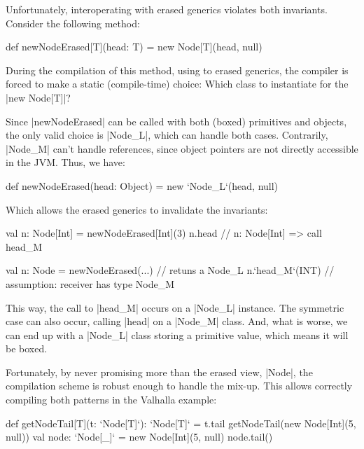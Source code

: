 Unfortunately, interoperating with erased generics violates both invariants. Consider the following method:

\begin{lstlisting-nobreak}
 def newNodeErased[T](head: T) =
   new Node[T](head, null)
\end{lstlisting-nobreak}

During the compilation of this method, using to erased generics, the compiler is forced to make a static (compile-time) choice: Which class to instantiate for the |new Node[T]|?

Since |newNodeErased| can be called with both (boxed) primitives and objects, the only valid choice is |Node_L|, which can handle both cases. Contrarily, |Node_M| can't handle references, since object pointers are not directly accessible in the JVM. Thus, we have: %

\begin{lstlisting-nobreak}
 def newNodeErased(head: Object) =
   new `Node_L`(head, null)
\end{lstlisting-nobreak}

Which allows the erased generics to invalidate the invariants:

\begin{lstlisting-nobreak}
 val n: Node[Int] = newNodeErased[Int](3)
 n.head // n: Node[Int] => call head_M
\end{lstlisting-nobreak}


\begin{lstlisting-nobreak}
 val n: Node = newNodeErased(...)               // retuns a Node_L
 n.`head_M`(INT)  // assumption: receiver has type Node_M
\end{lstlisting-nobreak}

This way, the call to |head_M| occurs on a |Node_L| instance. The symmetric case can also occur, calling |head| on a |Node_M| class. And, what is worse, we can end up with a |Node_L| class storing a primitive value, which means it will be boxed.

Fortunately, by never promising more than the erased view, |Node|, the compilation scheme is robust enough to handle the mix-up. This allows correctly compiling both patterns in the Valhalla example:

\begin{lstlisting-nobreak}
 def getNodeTail[T](t: `Node[T]`): `Node[T]` = t.tail
 getNodeTail(new Node[Int](5, null))
 val node: `Node[_]` = new Node[Int](5, null)
 node.tail()
\end{lstlisting-nobreak}

